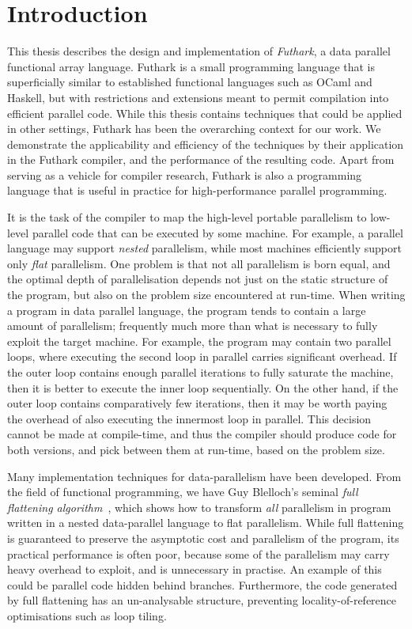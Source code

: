 \chapter{Introduction}

This thesis describes the design and implementation of
\textit{Futhark}, a data parallel functional array language.
Futhark is a small programming language that is superficially similar
to established functional languages such as OCaml and Haskell, but
with restrictions and extensions meant to permit compilation into
efficient parallel code.  While this thesis contains techniques that
could be applied in other settings, Futhark has been the overarching
context for our work.  We demonstrate the applicability and efficiency
of the techniques by their application in the Futhark compiler, and
the performance of the resulting code.  Apart from serving as a
vehicle for compiler research, Futhark is also a programming language
that is useful in practice for high-performance parallel programming.

It is the task of the compiler to map the high-level portable
parallelism to low-level parallel code that can be executed by some
machine.  For example, a parallel language may support \textit{nested}
parallelism, while most machines efficiently support only
\textit{flat} parallelism.  One problem is that not all parallelism is
born equal, and the optimal depth of parallelisation depends not just
on the static structure of the program, but also on the problem size
encountered at run-time.  When writing a program in data parallel
language, the program tends to contain a large amount of parallelism;
frequently much more than what is necessary to fully exploit the
target machine.  For example, the program may contain two parallel
loops, where executing the second loop in parallel carries significant
overhead.  If the outer loop contains enough parallel iterations to
fully saturate the machine, then it is better to execute the inner
loop sequentially.  On the other hand, if the outer loop contains
comparatively few iterations, then it may be worth paying the overhead
of also executing the innermost loop in parallel.  This decision
cannot be made at compile-time, and thus the compiler should produce
code for both versions, and pick between them at run-time, based on
the problem size.

Many implementation techniques for data-parallelism have been
developed.  From the field of functional programming, we have Guy
Blelloch's seminal \textit{full flattening
  algorithm}~\cite{blelloch1994implementation}, which shows how to
transform \textit{all} parallelism in program written in a nested
data-parallel language to flat parallelism.  While full flattening is
guaranteed to preserve the asymptotic cost and parallelism of the
program, its practical performance is often poor, because some of the
parallelism may carry heavy overhead to exploit, and is unnecessary in
practise.  An example of this could be parallel code hidden behind
branches.  Furthermore, the code generated by full flattening has an
un-analysable structure, preventing locality-of-reference
optimisations such as loop tiling.

